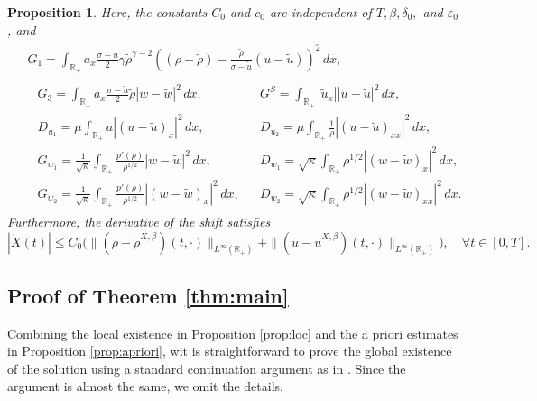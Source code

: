 \documentclass[11pt,reqno]{amsart}
\newtheorem{proposition}{Proposition}[section]
\numberwithin{equation}{section} %
\begin{document}
\begin{proposition}
    Here, the constants $C_0$ and $c_0$ are independent of $T, \beta, \delta_0,$ and $\varepsilon_0$, and
    \begin{equation}\label{terms}
    \begin{split}
        &\begin{aligned}
         G_1 = \int_{\mathbb{R}_+} a_x \frac{\sigma-\tilde{u}}{2}\gamma\tilde{\rho}^{\gamma-2}\left((\rho-\tilde{\rho})-\frac{\tilde{\rho}}{\sigma-\tilde{u}}(u-\tilde{u})\right)^2\,dx,   
        \end{aligned}\\
        &\begin{aligned}
        &G_3 = \int_{\mathbb{R}_+} a_x \frac{\sigma-\tilde{u}}{2}\tilde{\rho}|w-\tilde{w}|^2\,dx, &&
        G^S = \int_{\mathbb{R}_+} |\tilde{u}_x| |u- \tilde{u}|^2\,dx, \\
        &D_{u_1} = \mu \int_{\mathbb{R}_+} a |(u - \tilde{u})_x|^2\,dx, &&
        D_{u_2} = \mu \int_{\mathbb{R}_+} \frac{1}{\rho} |(u - \tilde{u})_{xx}|^2\,dx, \\
        &G_{w_1} = \frac{1}{\sqrt{\kappa}} \int_{\mathbb{R}_+} \frac{p'(\rho)}{\rho^{1/2}} |w - \tilde{w}|^2\,dx, &&
        D_{w_1} = \sqrt{\kappa} \int_{\mathbb{R}_+} \rho^{1/2} |(w - \tilde{w})_x|^2\,dx, \\
        &G_{w_2} = \frac{1}{\sqrt{\kappa}} \int_{\mathbb{R}_+} \frac{p'(\rho)}{\rho^{1/2}} |(w - \tilde{w})_x|^2\,dx, &&
        D_{w_2} = \sqrt{\kappa} \int_{\mathbb{R}_+} \rho^{1/2} |(w - \tilde{w})_{xx}|^2\,dx.
        \end{aligned}
    \end{split}
    \end{equation}
    Furthermore, the derivative of the shift satisfies 
    \[
    |\dot{X}(t)| \leq C_0 \big( \| (\rho - \tilde{\rho}^{X, \beta})(t,\cdot) \|_{L^\infty(\mathbb{R}_+)} + \| (u - \tilde{u}^{X, \beta})(t,\cdot) \|_{L^\infty(\mathbb{R}_+)} \big), \quad \forall t \in [0,T].
    \]
\end{proposition}




\subsection{Proof of Theorem \ref{thm:main}}
Combining the local existence in Proposition \ref{prop:loc} and the a priori estimates in Proposition \ref{prop:apriori}, wit is straightforward to prove the global existence of the solution using a standard continuation argument as in \cite{HK26,KOW25}. Since the argument is almost the same, we omit the details.
\end{document}
